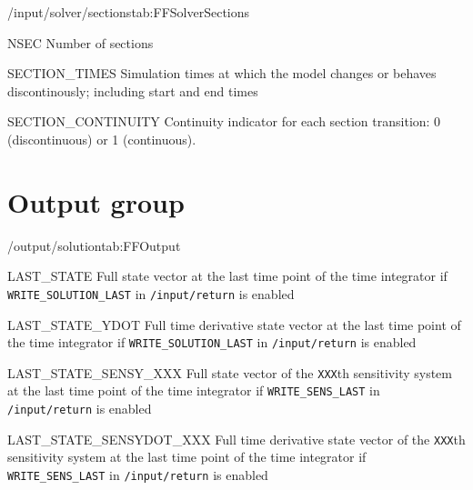 \begin{groupscope}{/input/solver/sections}{tab:FFSolverSections}
  \begin{dataset}[type=int,range={$\geq 1$},length=1]{NSEC}
    Number of sections
  \end{dataset}
  \begin{dataset}[type=double,unit={\si{\second}},range={$\geq 0$},length={$\texttt{NSEC}+1$}]{SECTION\_TIMES}
    Simulation times at which the model changes or behaves discontinously; including start and end times
  \end{dataset}
  \begin{dataset}[type=int,range={$\{0,1\}$},length={$\texttt{NSEC}-1$}]{SECTION\_CONTINUITY}
    Continuity indicator for each section transition: 0 (discontinuous) or 1 (continuous).
  \end{dataset}
\end{groupscope}

\section{Output group}\label{sec:FFOutput}

\begin{groupscope}{/output/solution}{tab:FFOutput}
  \begin{dataset}[type=double]{LAST\_STATE}
    Full state vector at the last time point of the time integrator if \texttt{WRITE\_SOLUTION\_LAST} in \texttt{/input/return} is enabled
  \end{dataset}
  \begin{dataset}[type=double]{LAST\_STATE\_YDOT}
    Full time derivative state vector at the last time point of the time integrator if \texttt{WRITE\_SOLUTION\_LAST} in \texttt{/input/return} is enabled
  \end{dataset}
  \begin{dataset}[type=double]{LAST\_STATE\_SENSY\_XXX}
    Full state vector of the \texttt{XXX}th sensitivity system at the last time point of the time integrator if \texttt{WRITE\_SENS\_LAST} in \texttt{/input/return} is enabled
  \end{dataset}
  \begin{dataset}[type=double]{LAST\_STATE\_SENSYDOT\_XXX}
    Full time derivative state vector of the \texttt{XXX}th sensitivity system at the last time point of the time integrator if \texttt{WRITE\_SENS\_LAST} in \texttt{/input/return} is enabled
  \end{dataset}
\end{groupscope}

